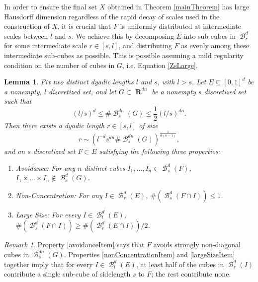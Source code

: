\documentclass[dvipsnames,letterpaper,12pt]{article}
\numberwithin{equation}{section}
\theoremstyle{plain}
\newtheorem{lemma}{Lemma}
\theoremstyle{remark}
\newtheorem*{remark}{Remark}
\DeclareMathOperator{\RR}{\mathbf{R}}
\DeclareMathOperator{\B}{\mathcal{B}}
\begin{document}
In order to ensure the final set $X$ obtained in Theorem \ref{mainTheorem} has large Hausdorff dimension regardless of the rapid decay of scales used in the construction of $X$, it is crucial that $F$ is uniformly distributed at intermediate scales between $l$ and $s$.
We achieve this by decomposing $E$ into sub-cubes in $\B^d_r$ for some intermediate scale $r \in [s,l]$, and distributing $F$ as evenly among these intermediate sub-cubes as possible. This is possible assuming a mild regularity condition on the number of cubes in $G$, i.e. Equation \eqref{ZsLarge}.
%

\begin{lemma} \label{discretelemma}
	Fix two distinct dyadic lengths $l$ and $s$, with $l > s$. Let $E \subseteq [0,1]^d$ be a nonempty, $l$ discretized set, and let $G\subset\RR^{dn}$ be a nonempty $s$ discretized set such that
	\begin{equation}\label{ZsLarge}
		(l/s)^d \leq \# \B^{dn}_s(G)  \leq \frac{1}{2}(l/s)^{dn}.
	\end{equation} 
	Then there exists a dyadic length $r \in [s,l]$ of size
	\begin{equation} \label{rBound}
	 	r \sim \left( l^{-d}s^{dn} \# \B^{dn}_s(G) \right)^{\frac{1}{d(n-1)}},
	\end{equation}
	and an $s$ discretized set $F \subset E$ satisfying the following three properties:
	\begin{enumerate}
		\item\label{avoidanceItem} \emph{Avoidance}: For any $n$ distinct cubes $I_1, \dots, I_n \in \B^d_s(F)$, $I_1 \times \dots \times I_n \not \in \B^d_s(G)$.

		\item\label{nonConcentrationItem} \emph{Non-Concentration}: For any $I \in \B_r^d(E)$, $\#(\B_s^d(F \cap I)) \leq 1$.

		\item\label{largeSizeItem} \emph{Large Size}: For every $I \in \B^d_l(E)$, $\#(\B^d_s(F \cap I)) \geq \#(\B^d_r(E \cap I))/2$.
	\end{enumerate}
\end{lemma}

\begin{remark}
	Property \ref{avoidanceItem} says that $F$ avoids strongly non-diagonal cubes in $\B^{dn}_s(G)$. Properties \ref{nonConcentrationItem} and \ref{largeSizeItem} together imply that for every $I \in \B^d_l(E)$, at least half of the cubes in $\B_r^d(I)$ contribute a single sub-cube of sidelength $s$ to $F$; the rest contribute none. 
\end{remark}
\end{document}
